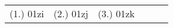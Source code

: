 \begin{eocexercises}{}
\par \practiceinfo
\par \begin{tabular}[h]{cccccc}

(1.) 01zi	&
(2.) 01zj	&
(3.) 01zk	&
\end{tabular}
\end{eocexercises} 




